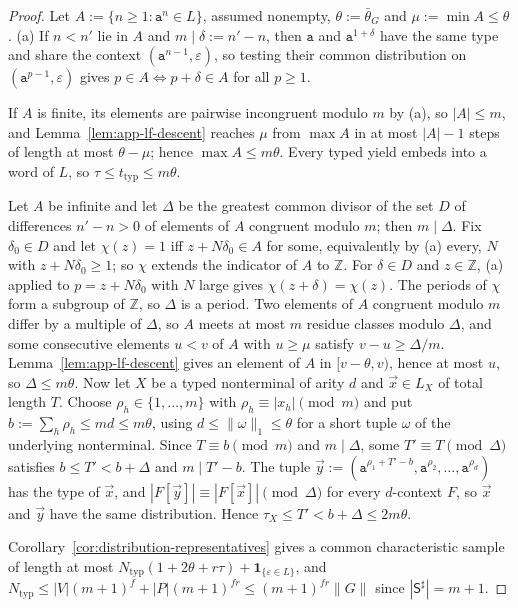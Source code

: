 \documentclass[11pt]{article}
\numberwithin{equation}{section}
\theoremstyle{plain}
\theoremstyle{definition}
\theoremstyle{remark}
\newcommand{\tuple}[1]{\vec{#1}}
\newcommand{\eps}{\varepsilon}
\begin{document}
\begin{proof}
Let $A:=\{n\ge1:\mathtt a^n\in L\}$, assumed nonempty, $\theta:=\bar\theta_G$ and
$\mu:=\min A\le\theta$.  (a) If $n<n'$ lie in $A$ and $m\mid\delta:=n'-n$, then
$\mathtt a$ and $\mathtt a^{1+\delta}$ have the same type and share the context
$(\mathtt a^{n-1},\eps)$, so testing their common distribution on
$(\mathtt a^{p-1},\eps)$ gives $p\in A\iff p+\delta\in A$ for all $p\ge1$.

If $A$ is finite, its elements are pairwise incongruent modulo $m$ by (a), so
$|A|\le m$, and Lemma~\ref{lem:app-lf-descent} reaches $\mu$ from $\max A$ in
at most $|A|-1$ steps of length at most $\theta-\mu$; hence $\max A\le m\theta$.
Every typed yield embeds into a word of $L$, so $\tau\le t_{\mathrm{typ}}\le m\theta$.

Let $A$ be infinite and let $\Delta$ be the greatest common divisor of the set $D$ of
differences $n'-n>0$ of elements of $A$ congruent modulo $m$; then $m\mid\Delta$.
Fix $\delta_0\in D$ and let $\chi(z)=1$ iff $z+N\delta_0\in A$ for some, equivalently
by (a) every, $N$ with $z+N\delta_0\ge1$; so $\chi$ extends the indicator of $A$ to
$\mathbb Z$.  For $\delta\in D$ and $z\in\mathbb Z$, (a) applied to $p=z+N\delta_0$ with $N$
large gives $\chi(z+\delta)=\chi(z)$.  The periods of $\chi$ form a subgroup of
$\mathbb Z$, so $\Delta$ is a period.  Two elements of $A$ congruent modulo $m$ differ by a multiple of $\Delta$, so
$A$ meets at most $m$ residue classes modulo $\Delta$, and some consecutive elements
$u<v$ of $A$ with $u\ge\mu$ satisfy $v-u\ge\Delta/m$.  Lemma~\ref{lem:app-lf-descent}
gives an element of $A$ in $[v-\theta,v)$, hence at most $u$, so $\Delta\le m\theta$.
Now let $X$ be a typed nonterminal of arity $d$ and $\tuple x\in L_X$ of total
length $T$.  Choose $\rho_h\in\{1,\ldots,m\}$ with $\rho_h\equiv|x_h|\pmod m$ and
put $b:=\sum_h\rho_h\le md\le m\theta$, using $d\le\|\omega\|_1\le\theta$ for a short
tuple $\omega$ of the underlying nonterminal.  Since $T\equiv b\pmod m$ and
$m\mid\Delta$, some $T'\equiv T\pmod\Delta$ satisfies $b\le T'<b+\Delta$ and $m\mid T'-b$.  The
tuple $\tuple y:=(\mathtt a^{\rho_1+T'-b},\mathtt a^{\rho_2},\ldots,\mathtt a^{\rho_d})$
has the type of $\tuple x$, and $|F[\tuple y]|\equiv|F[\tuple x]|\pmod\Delta$ for every
$d$-context $F$, so $\tuple x$ and $\tuple y$ have the same distribution.  Hence
$\tau_X\le T'<b+\Delta\le2m\theta$.

Corollary~\ref{cor:distribution-representatives} gives a common characteristic
sample of length at most $N_{\mathrm{typ}}(1+2\theta+r\tau)+\mathbf 1_{\{\eps\in L\}}$,
and $N_{\mathrm{typ}}\le|V|(m+1)^f+|P|(m+1)^{fr}\le(m+1)^{fr}\|G\|$ since
$|\mathsf S^\sharp|=m+1$.
\end{proof}
\end{document}
